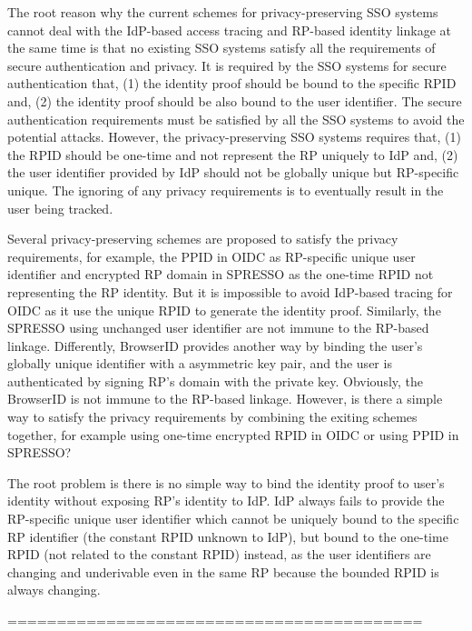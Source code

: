 {\color{red}
The root reason why the current schemes for privacy-preserving SSO systems cannot deal with the IdP-based access tracing and RP-based identity linkage at the same time is that no existing SSO systems satisfy all the requirements of secure authentication and privacy.
It is required by the SSO systems for secure authentication that, (1) the identity proof should be bound to the specific RPID and, (2) the identity proof should be also bound to the user identifier. The secure authentication requirements must be satisfied by all the SSO systems to avoid the potential attacks. However, the privacy-preserving SSO systems requires that, (1) the RPID should be one-time and not represent the RP uniquely to IdP and, (2) the user identifier provided by IdP should not be globally unique but RP-specific unique. The ignoring of any privacy requirements is to eventually result in the user being tracked.


Several privacy-preserving schemes are proposed to satisfy the privacy requirements, for example, the PPID in OIDC as RP-specific unique user identifier and encrypted RP domain in SPRESSO as the one-time RPID not representing the RP identity. But it is impossible to avoid IdP-based tracing for OIDC as it use the unique RPID to generate the identity proof. Similarly, the SPRESSO using unchanged user identifier are not immune to the RP-based linkage. Differently, BrowserID provides another way by binding the user's globally unique identifier with a asymmetric key pair, and the user is  authenticated by signing RP's domain with the private key. Obviously, the BrowserID is not immune to the RP-based linkage.
However, is there a simple way to satisfy the privacy requirements by combining the exiting schemes together, for example using one-time encrypted RPID in OIDC or using PPID in SPRESSO?

The root problem is there is no simple way to bind the identity proof to user's identity without exposing RP's identity to IdP.
IdP always fails to provide the RP-specific unique user identifier which cannot be uniquely bound to the specific RP identifier (the constant RPID unknown to IdP), but bound to the one-time RPID (not related to the constant RPID) instead, as the user identifiers are changing and underivable even in the same RP because the bounded RPID is always changing.
}

==========================================

